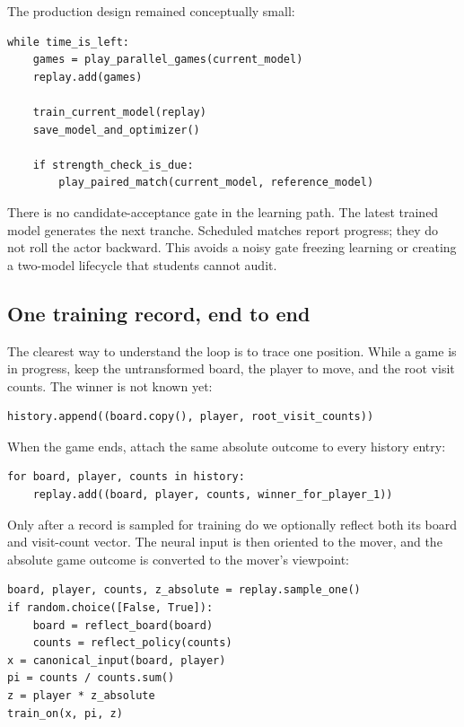 \documentclass[10.5pt,letterpaper]{article}
\begin{document}
The production design remained conceptually small:

\begin{lstlisting}[style=azcode]
while time_is_left:
    games = play_parallel_games(current_model)
    replay.add(games)

    train_current_model(replay)
    save_model_and_optimizer()

    if strength_check_is_due:
        play_paired_match(current_model, reference_model)
\end{lstlisting}

There is no candidate-acceptance gate in the learning path. The latest trained
model generates the next tranche. Scheduled matches report progress; they do
not roll the actor backward. This avoids a noisy gate freezing learning or
creating a two-model lifecycle that students cannot audit.

\subsection{One training record, end to end}

The clearest way to understand the loop is to trace one position. While a game
is in progress, keep the untransformed board, the player to move, and the root
visit counts. The winner is not known yet:

\begin{lstlisting}[style=azcode]
history.append((board.copy(), player, root_visit_counts))
\end{lstlisting}

When the game ends, attach the same absolute outcome to every history entry:

\begin{lstlisting}[style=azcode]
for board, player, counts in history:
    replay.add((board, player, counts, winner_for_player_1))
\end{lstlisting}

Only after a record is sampled for training do we optionally reflect both its
board and visit-count vector. The neural input is then oriented to the mover,
and the absolute game outcome is converted to the mover's viewpoint:

\begin{lstlisting}[style=azcode]
board, player, counts, z_absolute = replay.sample_one()
if random.choice([False, True]):
    board = reflect_board(board)
    counts = reflect_policy(counts)
x = canonical_input(board, player)
pi = counts / counts.sum()
z = player * z_absolute
train_on(x, pi, z)
\end{lstlisting}
\end{document}
